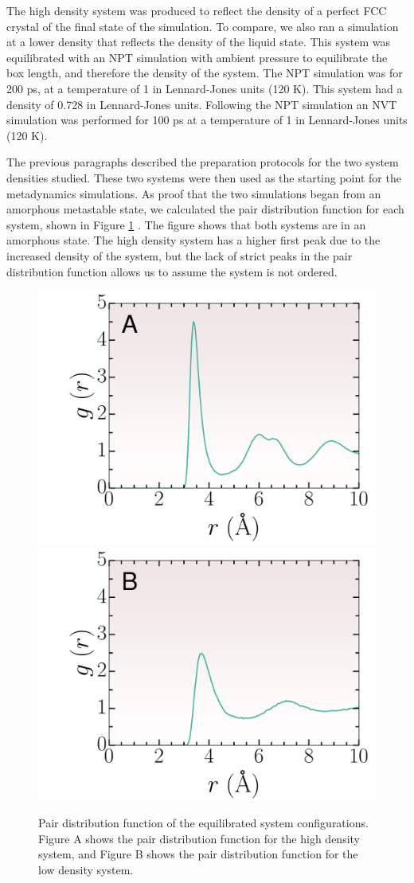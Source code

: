 The high density system was produced to reflect the density of a perfect FCC crystal of the final state of the simulation.  To compare, we also ran a simulation at a lower density that reflects the density of the liquid state.  This system was equilibrated with an NPT simulation with ambient pressure to equilibrate the box length, and therefore the density of the system.  The NPT simulation was for 200 ps, at a temperature of 1 in Lennard-Jones units (120 K).  This system had a density of 0.728 in Lennard-Jones units.  Following the NPT simulation an NVT simulation was performed for 100 ps at a temperature of 1 in Lennard-Jones units (120 K).

The previous paragraphs described the preparation protocols for the two system densities studied.  These two systems were then used as the starting point for the metadynamics simulations.  As proof that the two simulations began from an amorphous metastable state, we calculated the pair distribution function for each system, shown in Figure \ref{gofr} \cite{HANSEN2006v}.  The figure shows that both systems are in an amorphous state.  The high density system has a higher first peak due to the increased density of the system, but the lack of strict peaks in the pair distribution function allows us to assume the system is not ordered. 

\begin{figure}[h]
	\centering
	\includegraphics[width = .45\textwidth]{./Figures/Nucleation/high_density/g_r.pdf}
	\hspace{.03\textwidth}
	\includegraphics[width = .45\textwidth]{./Figures/Nucleation/low_density/g_r.pdf}
	\caption{Pair distribution function of the equilibrated system configurations.  Figure A shows the pair distribution function for the high density system, and Figure B shows the pair distribution function for the low density system.}
	\label{gofr}
\end{figure}  

